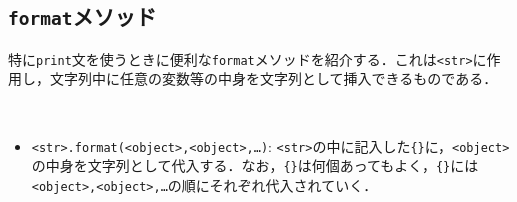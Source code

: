 \begin{cod}[\texttt{py3.py}]　
}]{code/py3.py}
\vspace{-7pt}
\begin{lstlisting}
<class 'str'>
<class 'type'>
\end{lstlisting}
\end{cod}
\vspace{-10pt}

\subsection{\texttt{format}メソッド}

特に\texttt{print}文を使うときに便利な\texttt{format}メソッドを紹介する．これは\texttt{<str>}に作用し，文字列中に任意の変数等の中身を文字列として挿入できるものである．

\begin{gram}　
\begin{itemize}
\item \texttt{<str>.format(<object>,<object>,\ldots)}: \texttt{<str>}の中に記入した\texttt{\{\}}に，\texttt{<object>}の中身を文字列として代入する．なお，\texttt{\{\}}は何個あってもよく，\texttt{\{\}}には\texttt{<object>,<object>,\ldots}の順にそれぞれ代入されていく．
\end{itemize}
\end{gram}

\begin{cod}[\texttt{py4.py}]　
}]{code/py4.py}
\vspace{-7pt}
\begin{lstlisting}
p={'x': 3, 'y': 5}, type=<class 'dict'>
\end{lstlisting}
\end{cod}
\vspace{-10pt}
